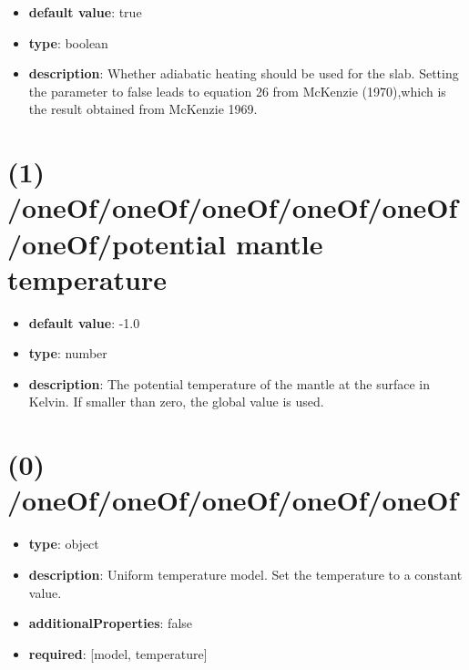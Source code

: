 \begin{itemize}[leftmargin=1em]\item {\bf default value}: true
\item {\bf type}: boolean
\item {\bf description}: Whether adiabatic heating should be used for the slab. Setting the parameter to false leads to equation 26 from McKenzie (1970),which is the result obtained from McKenzie 1969.
\end{itemize}\section{(1) /oneOf/oneOf/oneOf/oneOf/oneOf/oneOf/potential mantle temperature}
\begin{itemize}[leftmargin=1em]\item {\bf default value}: -1.0
\item {\bf type}: number
\item {\bf description}: The potential temperature of the mantle at the surface in Kelvin. If smaller than zero, the global value is used.
\end{itemize}\section{(0) /oneOf/oneOf/oneOf/oneOf/oneOf}
\begin{itemize}[leftmargin=0em]\item {\bf type}: object
\item {\bf description}: Uniform temperature model. Set the temperature to a constant value.
\item {\bf additionalProperties}: false
\item {\bf required}: [model, temperature]\end{itemize}
